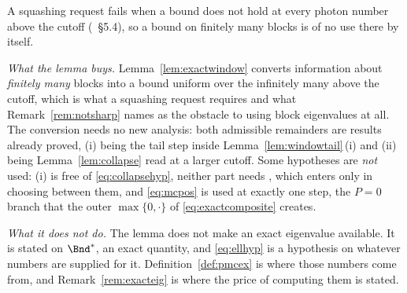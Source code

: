 
A squashing request fails when a bound does not hold at every photon number
above the cutoff (~\S5.4), so a bound on
finitely many blocks is of no use there by itself.

\begin{remark}\label{rem:exactscope}
\emph{What the lemma buys.} Lemma~\ref{lem:exactwindow} converts information
about \emph{finitely many} blocks into a bound uniform over the infinitely
many above the cutoff, which is what a squashing request requires and
what Remark~\ref{rem:notsharp} names as the obstacle to using block eigenvalues at all. The conversion needs no new
analysis: both admissible remainders are results already proved, (i) being
the tail step inside Lemma~\ref{lem:windowtail}\,(i) and (ii) being
Lemma~\ref{lem:collapse} read at a larger cutoff. Some hypotheses are
\emph{not} used: (i) is free of \eqref{eq:collapsehyp}, neither part needs
, which enters only in choosing between
them, and \eqref{eq:mcpos} is used at exactly one step, the $P=0$ branch that
the outer $\max\{0,\cdot\}$ of \eqref{eq:exactcomposite} creates.

\emph{What it does not do.} The lemma does not make an exact eigenvalue
available. It is stated on $\Bnd^{\ast}$, an exact quantity, and
\eqref{eq:ellhyp} is a hypothesis on whatever numbers are supplied for it.
Definition~\ref{def:pmcex} is where those numbers come from, and
Remark~\ref{rem:exacteig} is where the price of computing them is stated.
\end{remark}
